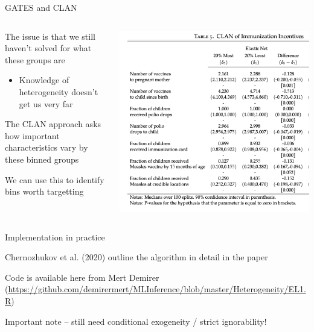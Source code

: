 \documentclass[notes,11pt, aspectratio=169]{beamer}
\newenvironment{wideitemize}{\itemize\addtolength{\itemsep}{10pt}}{\enditemize}
\begin{document}
\begin{frame}{GATES and CLAN}
    \begin{columns}[onlytextwidth, T] %
      \begin{column}{.5\textwidth}
  \begin{wideitemize}
  \item The issue is that we still haven't solved for what these groups are
    \begin{itemize}
    \item Knowledge of heterogeneity doesn't get us very far
    \end{itemize}
  \item The CLAN approach asks how important characteristics vary by
    these binned groups
  \item We can use this to identify bins worth targetting
  \end{wideitemize}
      \end{column}%
      \hfill%
      \begin{column}{.5\textwidth}
        \includegraphics[width=\linewidth]{images/CLAN.png}
      \end{column}%
    \end{columns}
\end{frame}

\begin{frame}{Implementation in practice}
  \begin{wideitemize}
  \item Chernozhukov et al. (2020) outline the algorithm in detail in the paper
  \item Code is available here from Mert Demirer
    (\url{https://github.com/demirermert/MLInference/blob/master/Heterogeneity/EL1.R})
  \item Important note -- still need conditional exogeneity / strict ignorability!
  \end{wideitemize}
  
\end{frame}
\end{document}
